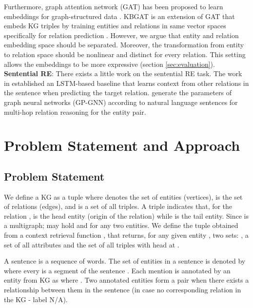 \documentclass[sigconf]{acmart}
\begin{document}
Furthermore, graph attention network (GAT) has been proposed to learn embeddings for graph-structured data \cite{velivckovic2017graph}. KBGAT is an extension of GAT that embeds KG triples by training entities and relations in same vector spaces specifically for relation prediction \cite{DBLP:conf/acl/NathaniCSK19}. However, we argue that entity and relation embedding space should be separated. Moreover, the transformation from entity to relation space should be nonlinear and distinct for every relation. This setting allows the embeddings to be more expressive (section \ref{sec:evaluation}).\\
\textbf{Sentential RE}: There exists a little work on the sentential RE task. The work in \cite{DBLP:conf/emnlp/SorokinG17} established an LSTM-based baseline that learns context from other relations in the sentence when predicting the target relation. \cite{DBLP:conf/acl/ZhuLLFCS19} generate the parameters of graph neural networks (GP-GNN) according to natural language sentences for multi-hop relation reasoning for the entity pair.  



\section{Problem Statement and Approach} \label{sec:problem}
\subsection{Problem Statement}
We define a KG as a tuple  where  denotes the set of entities (vertices),  is the set of relations (edges), and  is a set of all triples. A triple  indicates that, for the relation ,  is the head entity (origin of the relation) while  is the tail entity. Since  is a multigraph;  may hold and  for any two entities. We define the tuple  obtained from a context retrieval function , that returns, for any given entity , two sets: , a set of all attributes and  the set of all triples with head at .

A sentence  is a sequence of words.
The set of entities in a sentence is denoted by  where every  is a segment of the sentence .
Each mention is annotated by an entity from KG as  where . Two annotated entities form a pair  when there exists a relationship between them in the sentence (in case no corresponding relation in the KG - label N/A).
\end{document}

